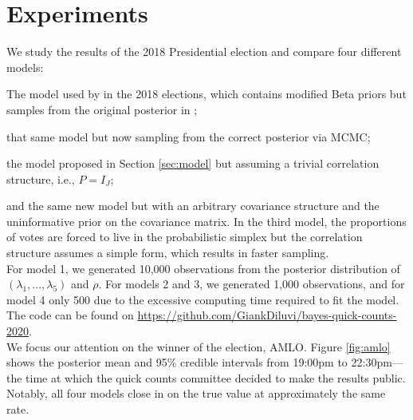 \documentclass{article}
\begin{document}



\section{Experiments} \label{sec:experiments}


We study the results of the 2018 Presidential election and compare four different models:
\benum
  \item The model used by \citet{diluvi2018} in the 2018 elections, which contains modified Beta priors but samples from the original posterior in \citet{mendoza-nieto2016};
  \item that same model but now sampling from the correct posterior via MCMC;
  \item the model proposed in Section \ref{sec:model} but assuming a trivial correlation structure, i.e., $P = I_J$;
  \item and the same new model but with an arbitrary covariance structure and the uninformative prior on the covariance matrix.
\eenum
In the third model, the proportions of votes are forced to live in the probabilistic simplex but the correlation structure assumes a simple form, which results in faster sampling. \\

For model 1, we generated 10,000 observations from the posterior distribution of $(\lambda_1, ..., \lambda_5)$ and $\rho$. For models 2 and 3, we generated 1,000 observations, and for model 4 only 500 due to the excessive computing time required to fit the model. The code can be found on \href{https://github.com/GiankDiluvi/bayes-quick-counts-2020}{\url{https://github.com/GiankDiluvi/bayes-quick-counts-2020}}. \\


We focus our attention on the winner of the election, AMLO. Figure \ref{fig:amlo} shows the posterior mean and 95\% credible intervals from 19:00pm to 22:30pm---the time at which the quick counts committee decided to make the results public. Notably, all four models close in on the true value at approximately the same rate. \\
\end{document}
